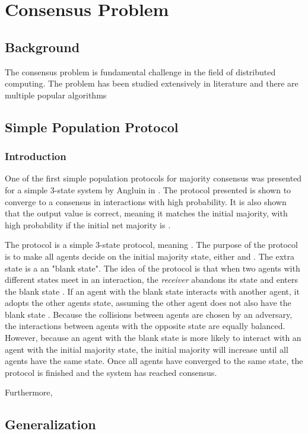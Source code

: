 \section{Consensus Problem}
\subsection{Background}

The consensus problem is fundamental challenge in the field of distributed computing. The problem has been studied extensively in literature and there are multiple popular algorithms 


\subsection{Simple Population Protocol}


\subsubsection{Introduction}

One of the first simple population protocols for majority consensus was presented for a simple 3-state system by Angluin in \cite{angluinSimplePopulationProtocol2008}. The protocol presented is shown to converge to a consensus in  interactions with high probability. It is also shown that the output value is correct, meaning it matches the initial majority, with high probability if the initial net majority is .

The protocol is a simple 3-state protocol, meaning . The purpose of the protocol is to make all agents decide on the initial majority state, either  and . The extra state  is a an "blank state". The idea of the protocol is that when two agents with different states meet in an interaction, the \emph{receiver} abandons its state and enters the blank state . If an agent with the blank state  interacts with another agent, it adopts the other agents state, assuming the other agent does not also have the blank state . Because the collisions between agents are chosen by an adversary, the interactions between agents with the opposite state are equally balanced. However, because an agent with the blank state is more likely to interact with an agent with the initial majority state, the initial majority will increase until all agents have the same state. Once all agents have converged to the same state, the protocol is finished and the system has reached consensus. 

Furthermore, 
\subsection{Generalization}

\clearpage